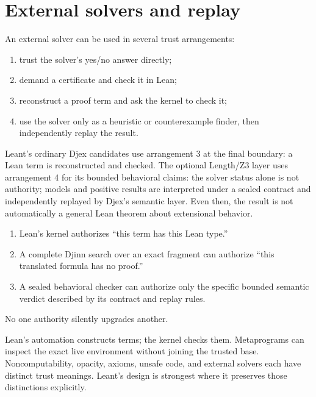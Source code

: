 \documentclass[10pt,letterpaper,oneside,openany]{report}
\begin{document}
\section{External solvers and replay}

An external solver can be used in several trust arrangements:

\begin{enumerate}
\item trust the solver's yes/no answer directly;
\item demand a certificate and check it in Lean;
\item reconstruct a proof term and ask the kernel to check it;
\item use the solver only as a heuristic or counterexample finder, then independently replay the result.
\end{enumerate}

Leant's ordinary Djex candidates use arrangement 3 at the final boundary: a Lean term is reconstructed and checked.  The optional Length/Z3 layer uses arrangement 4 for its bounded behavioral claims: the solver status alone is not authority; models and positive results are interpreted under a sealed contract and independently replayed by Djex's semantic layer.  Even then, the result is not automatically a general Lean theorem about extensional behavior.

\begin{keyidea}
\begin{enumerate}
\item Lean's kernel authorizes ``this term has this Lean type.''
\item A complete Djinn search over an exact fragment can authorize ``this translated formula has no proof.''
\item A sealed behavioral checker can authorize only the specific bounded semantic verdict described by its contract and replay rules.
\end{enumerate}
No one authority silently upgrades another.
\end{keyidea}

\begin{recapbox}
Lean's automation constructs terms; the kernel checks them.  Metaprograms can inspect the exact live environment without joining the trusted base.  Noncomputability, opacity, axioms, unsafe code, and external solvers each have distinct trust meanings.  Leant's design is strongest where it preserves those distinctions explicitly.
\end{recapbox}
\end{document}
